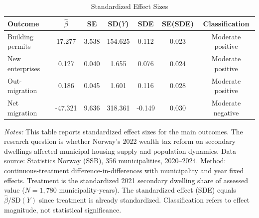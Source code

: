 \begin{table}[t]
\centering
\caption{Standardized Effect Sizes}
\label{tab:sde}
\begin{tabular}{lcccccc}
\hline\hline
Outcome & $\hat{\beta}$ & SE & SD($Y$) & SDE & SE(SDE) & Classification \\
\hline
Building permits & 17.277 & 3.538 & 154.625 & 0.112 & 0.023 & Moderate positive \\
New enterprises & 0.127 & 0.040 & 1.655 & 0.076 & 0.024 & Moderate positive \\
Out-migration & 0.186 & 0.045 & 1.601 & 0.116 & 0.028 & Moderate positive \\
Net migration & -47.321 & 9.636 & 318.361 & -0.149 & 0.030 & Moderate negative \\
\hline\hline
\end{tabular}
\begin{minipage}{0.95\textwidth}
\vspace{0.3em}
\footnotesize \textit{Notes:} This table reports standardized effect sizes for the main outcomes. The research question is whether Norway's 2022 wealth tax reform on secondary dwellings affected municipal housing supply and population dynamics. Data source: Statistics Norway (SSB), 356 municipalities, 2020--2024. Method: continuous-treatment difference-in-differences with municipality and year fixed effects. Treatment is the standardized 2021 secondary dwelling share of assessed value ($N = 1{,}780$ municipality-years). The standardized effect (SDE) equals $\hat{\beta}/\text{SD}(Y)$ since treatment is already standardized. Classification refers to effect magnitude, not statistical significance.
\end{minipage}
\end{table}
